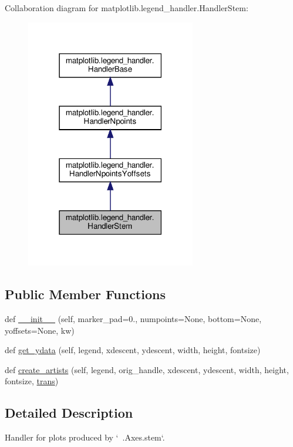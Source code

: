 Collaboration diagram for matplotlib.\+legend\+\_\+handler.\+Handler\+Stem\+:
\nopagebreak
\begin{figure}[H]
\begin{center}
\leavevmode
\includegraphics[width=210pt]{classmatplotlib_1_1legend__handler_1_1HandlerStem__coll__graph}
\end{center}
\end{figure}
\subsection*{Public Member Functions}
\begin{DoxyCompactItemize}
\item 
def \hyperlink{classmatplotlib_1_1legend__handler_1_1HandlerStem_af2251ec0e25de0c8384843206629041b}{\+\_\+\+\_\+init\+\_\+\+\_\+} (self, marker\+\_\+pad=0., numpoints=None, bottom=None, yoffsets=None, kw)
\item 
def \hyperlink{classmatplotlib_1_1legend__handler_1_1HandlerStem_a2f87fa4ab11eba1bea81f4f3fb663aae}{get\+\_\+ydata} (self, legend, xdescent, ydescent, width, height, fontsize)
\item 
def \hyperlink{classmatplotlib_1_1legend__handler_1_1HandlerStem_aa27400d30978a8045efba52e1236114f}{create\+\_\+artists} (self, legend, orig\+\_\+handle, xdescent, ydescent, width, height, fontsize, \hyperlink{size_2foo_8f90_afabfd8da71309850231a00e53c61f106}{trans})
\end{DoxyCompactItemize}


\subsection{Detailed Description}
\begin{DoxyVerb}Handler for plots produced by `~.Axes.stem`.
\end{DoxyVerb}
 

